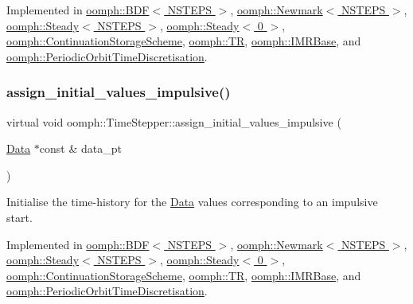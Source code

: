 Implemented in \hyperlink{classoomph_1_1BDF_a2506824a840f47d5d816b68f6144c7e7}{oomph\+::\+B\+D\+F$<$ N\+S\+T\+E\+P\+S $>$}, \hyperlink{classoomph_1_1Newmark_a8b058a0cc65b0f24a119d5d9120952a2}{oomph\+::\+Newmark$<$ N\+S\+T\+E\+P\+S $>$}, \hyperlink{classoomph_1_1Steady_ad0aa4ed8297b77af2295827b1c0052b0}{oomph\+::\+Steady$<$ N\+S\+T\+E\+P\+S $>$}, \hyperlink{classoomph_1_1Steady_ad0aa4ed8297b77af2295827b1c0052b0}{oomph\+::\+Steady$<$ 0 $>$}, \hyperlink{classoomph_1_1ContinuationStorageScheme_a6d8eb64dca810444b461cd893ad7526c}{oomph\+::\+Continuation\+Storage\+Scheme}, \hyperlink{classoomph_1_1TR_a46878c5cd5b9d20afb2f5d9ab7a7df26}{oomph\+::\+TR}, \hyperlink{classoomph_1_1IMRBase_ae9c3433ed870a32d2f94f7aa7b39104e}{oomph\+::\+I\+M\+R\+Base}, and \hyperlink{classoomph_1_1PeriodicOrbitTimeDiscretisation_ab0445858504afb534970431e8bf2d3c6}{oomph\+::\+Periodic\+Orbit\+Time\+Discretisation}.

\mbox{\label{classoomph_1_1TimeStepper_a7e894df13c88c96dd8eced2700228225}} 
\subsubsection{\texorpdfstring{assign\+\_\+initial\+\_\+values\+\_\+impulsive()}{assign\_initial\_values\_impulsive()}}
{\footnotesize\ttfamily virtual void oomph\+::\+Time\+Stepper\+::assign\+\_\+initial\+\_\+values\+\_\+impulsive (\begin{DoxyParamCaption}\item[{\hyperlink{classoomph_1_1Data}{Data} $\ast$const \&}]{data\+\_\+pt }\end{DoxyParamCaption})\hspace{0.3cm}{\ttfamily [pure virtual]}}



Initialise the time-\/history for the \hyperlink{classoomph_1_1Data}{Data} values corresponding to an impulsive start. 



Implemented in \hyperlink{classoomph_1_1BDF_a569e571e8f96382bfa9cecd7abb05af4}{oomph\+::\+B\+D\+F$<$ N\+S\+T\+E\+P\+S $>$}, \hyperlink{classoomph_1_1Newmark_a97195b87c11688ae6c17f1a5d2f821e1}{oomph\+::\+Newmark$<$ N\+S\+T\+E\+P\+S $>$}, \hyperlink{classoomph_1_1Steady_a1e25537dc2c134d8d23a9d5c1a1be328}{oomph\+::\+Steady$<$ N\+S\+T\+E\+P\+S $>$}, \hyperlink{classoomph_1_1Steady_a1e25537dc2c134d8d23a9d5c1a1be328}{oomph\+::\+Steady$<$ 0 $>$}, \hyperlink{classoomph_1_1ContinuationStorageScheme_a24344971f7f5dd254488f7373ceb2074}{oomph\+::\+Continuation\+Storage\+Scheme}, \hyperlink{classoomph_1_1TR_aa73845654866b5cf65ee801f67baa6b3}{oomph\+::\+TR}, \hyperlink{classoomph_1_1IMRBase_a2de3063187cd9d18db4cd36c36806f2f}{oomph\+::\+I\+M\+R\+Base}, and \hyperlink{classoomph_1_1PeriodicOrbitTimeDiscretisation_a45c5cd901ddf52fb1566665a2e161497}{oomph\+::\+Periodic\+Orbit\+Time\+Discretisation}.



